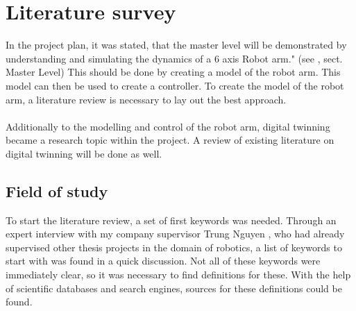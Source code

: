 \chapter{Literature survey}

In the project plan, it was stated, that the master level will be demonstrated by understanding and simulating the dynamics of a 6 axis Robot arm." (see \cite{ProjectPlan}, sect. Master Level)
This should be done by creating a model of the robot arm. This model can then be used to create a controller.
To create the model of the robot arm, a literature review is necessary to lay out the best approach.\\
\\ 

Additionally to the modelling and control of the robot arm, digital twinning became a research topic within the project. 
A review of existing literature on digital twinning will be done as well.
\bigskip

\section{Field of study}

To start the literature review, a set of first keywords was needed. Through an expert interview with my company supervisor Trung Nguyen \cite{Trung} , who had already supervised other thesis projects in the domain of robotics, a list of keywords to start with was found in a quick discussion. 
Not all of these keywords were immediately clear, so it was necessary to find definitions for these. 
With the help of scientific databases and search engines, sources for these definitions could be found.\\




